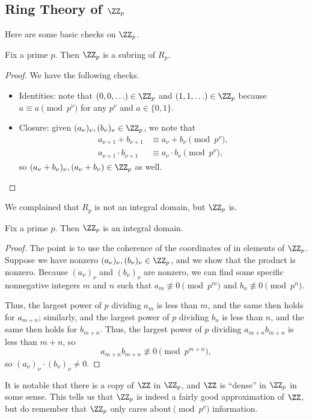 \documentclass[../notes.tex]{subfiles}
\begin{document}
\subsection{Ring Theory of \texorpdfstring{$\ZZ_p$}{ Zp}}
Here are some basic checks on $\ZZ_p$.
\begin{lemma}
	Fix a prime $p$. Then $\ZZ_p$ is a subring of $R_p$.
\end{lemma}
\begin{proof}
	We have the following checks.
	\begin{itemize}
		\item Identities: note that $(0,0,\ldots)\in\ZZ_p$ and $(1,1,\ldots)\in\ZZ_p$ because $a\equiv a\pmod{p^\nu}$ for any $p^\nu$ and $a\in\{0,1\}$.
		\item Closure: given $(a_\nu)_\nu,(b_\nu)_\nu\in\ZZ_p$, we note that
		\begin{align*}
			a_{\nu+1}+b_{\nu+1} &\equiv a_\nu+b_\nu\pmod{p^\nu}, \\
			a_{\nu+1}\cdot b_{\nu+1} &\equiv a_\nu\cdot b_\nu\pmod{p^\nu},
		\end{align*}
		so $(a_\nu+b_\nu)_\nu,(a_\nu+b_\nu)\in\ZZ_p$ as well.
		\qedhere
	\end{itemize}
\end{proof}
We complained that $R_p$ is not an integral domain, but $\ZZ_p$ is.
\begin{lemma} \label{lem:zp-int-domain}
	Fix a prime $p$. Then $\ZZ_p$ is an integral domain.
\end{lemma}
\begin{proof}
	The point is to use the coherence of the coordinates of in elements of $\ZZ_p$. Suppose we have nonzero $(a_\nu)_\nu,(b_\nu)_\nu\in\ZZ_p$, and we show that the product is nonzero. Because $(a_\nu)_\nu$ and $(b_\nu)_\nu$ are nonzero, we can find some specific nonnegative integers $m$ and $n$ such that $a_m\not\equiv0\pmod{p^m}$ and $b_n\not\equiv0\pmod{p^n}$.
	
	Thus, the largest power of $p$ dividing $a_m$ is less than $m$, and the same then holds for $a_{m+n}$; similarly, and the largest power of $p$ dividing $b_n$ is less than $n$, and the same then holds for $b_{m+n}$. Thus, the largest power of $p$ dividing $a_{m+n}b_{m+n}$ is less than $m+n$, so
	\[a_{m+n}b_{m+n}\not\equiv0\pmod{p^{m+n}},\]
	so $(a_\nu)_\nu\cdot(b_\nu)_\nu\ne0$.
\end{proof}
It is notable that there is a copy of $\ZZ$ in $\ZZ_p$, and $\ZZ$ is ``dense'' in $\ZZ_p$ in some sense. This tells us that $\ZZ_p$ is indeed a fairly good approximation of $\ZZ$, but do remember that $\ZZ_p$ only cares about$\pmod{p^\nu}$ information.
\end{document}
